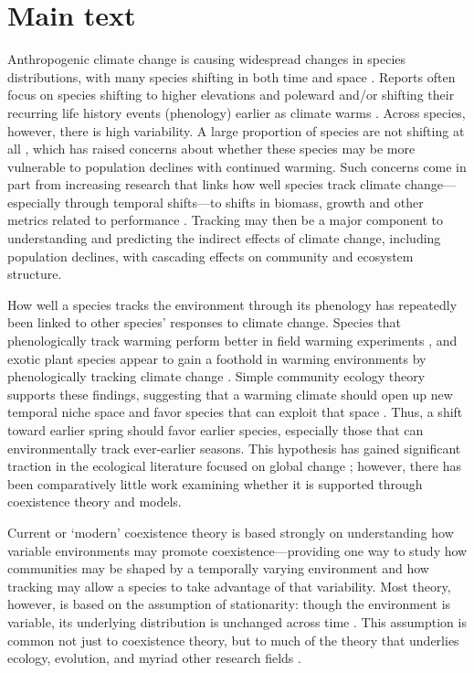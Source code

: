 \documentclass[11pt,letterpaper]{article}
\begin{document}
\newpage
\linenumbers

\section{Main text}
Anthropogenic climate change is causing widespread changes in species distributions, with many species shifting in both time and space \citep{IPCC:2014sm}. Reports often focus on species shifting to higher elevations and poleward \citep{Chen2011} and/or shifting their recurring life history events (phenology) earlier as climate warms \citep{Wolkovich:2012n,cohen2018}. Across species, however, there is high variability. A large proportion of species are not shifting at all \citep{Cook:2012pnas}, which has raised concerns about whether these species may be more vulnerable to population declines with continued warming. Such concerns come in part from increasing research that links how well species track climate change---especially through temporal shifts---to shifts in biomass, growth and other metrics related to performance \citep{Cleland:2012}. Tracking may then be a major component to understanding and predicting the indirect effects of climate change, including population declines, with cascading effects on community and ecosystem structure.

How well a species tracks the environment through its phenology has repeatedly been linked to other species' responses to climate change. Species that phenologically track warming perform better in field warming experiments \citep{Cleland:2012}, and exotic plant species appear to gain a foothold in warming environments by phenologically tracking climate change \citep{Willis:2010al}. Simple community ecology theory supports these findings, suggesting that a warming climate should open up new temporal niche space and favor species that can exploit that space \citep{gotelli1996,wolkovich:2010fee,Zettlemoyer2019}. Thus, a shift toward earlier spring should favor earlier species, especially those that can environmentally track ever-earlier seasons. This hypothesis has gained significant traction in the ecological literature focused on global change \citep[e.g.,][]{Cleland:2012}; however, there has been comparatively little work examining whether it is supported through coexistence theory and models. %

Current or `modern' coexistence theory is based strongly on understanding how variable environments may promote coexistence---providing one way to study how communities may be shaped by a temporally varying environment and how tracking may allow a species to take advantage of that variability. Most theory, however, is based on the assumption of stationarity: though the environment is variable, its underlying distribution is unchanged across time \citep[i.e., constant mean and variance,][]{barabas2018}. This assumption is common not just to coexistence theory, but to much of the theory that underlies ecology, evolution, and myriad other research fields \citep[e.g.,][]{Milly:2008yu,nosenko2013}. 
\end{document}
